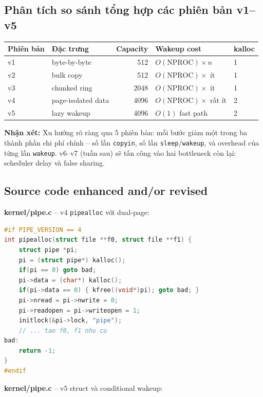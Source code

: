 \documentclass[11pt,a4paper]{article}
\begin{document}
\subsection{Phân tích so sánh tổng hợp các phiên bản v1--v5}

\begin{center}
\begin{tabularx}{\linewidth}{lXrll}
\toprule
\textbf{Phiên bản} & \textbf{Đặc trưng} & \textbf{Capacity} & \textbf{Wakeup cost} & \textbf{kalloc} \\
\midrule
v1 & byte-by-byte        & 512  & $O(\text{NPROC}) \times n$        & 1 \\
v2 & bulk copy           & 512  & $O(\text{NPROC}) \times$ ít        & 1 \\
v3 & chunked ring        & 2048 & $O(\text{NPROC}) \times$ ít        & 1 \\
v4 & page-isolated data  & 4096 & $O(\text{NPROC}) \times$ rất ít    & 2 \\
v5 & lazy wakeup         & 4096 & $O(1)$ fast path                   & 2 \\
\bottomrule
\end{tabularx}
\end{center}

\textbf{Nhận xét:} Xu hướng rõ ràng qua 5 phiên bản: mỗi bước giảm một trong ba thành phần chi phí chính -- số lần \texttt{copyin}, số lần \texttt{sleep}/\texttt{wakeup}, và overhead của từng lần \texttt{wakeup}. v6--v7 (tuần sau) sẽ tấn công vào hai bottleneck còn lại: scheduler delay và false sharing.

\subsection{Source code enhanced and/or revised}

\textbf{kernel/pipe.c} -- v4 \texttt{pipealloc} với dual-page:

\begin{lstlisting}[language=C]
#if PIPE_VERSION == 4
int pipealloc(struct file **f0, struct file **f1) {
    struct pipe *pi;
    pi = (struct pipe*) kalloc();
    if(pi == 0) goto bad;
    pi->data = (char*) kalloc();
    if(pi->data == 0) { kfree((void*)pi); goto bad; }
    pi->nread = pi->nwrite = 0;
    pi->readopen = pi->writeopen = 1;
    initlock(&pi->lock, "pipe");
    // ... tao f0, f1 nhu cu
bad:
    return -1;
}
#endif
\end{lstlisting}

\textbf{kernel/pipe.c} -- v5 struct và conditional wakeup:
\end{document}
